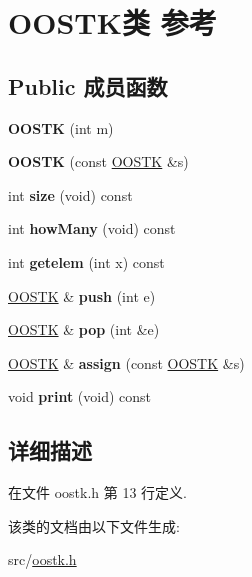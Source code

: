 \hypertarget{classOOSTK}{}\section{O\+O\+S\+T\+K类 参考}
\label{classOOSTK}
\subsection*{Public 成员函数}
\begin{DoxyCompactItemize}
\item 
{\bfseries O\+O\+S\+TK} (int m)\hypertarget{classOOSTK_af1012889d2e4e1ef9acfbe107feb241e}{}\label{classOOSTK_af1012889d2e4e1ef9acfbe107feb241e}

\item 
{\bfseries O\+O\+S\+TK} (const \hyperlink{classOOSTK}{O\+O\+S\+TK} \&s)\hypertarget{classOOSTK_aff2d32aaf48160e5b1ad971445ce8f15}{}\label{classOOSTK_aff2d32aaf48160e5b1ad971445ce8f15}

\item 
int {\bfseries size} (void) const \hypertarget{classOOSTK_a1c669595dd6c02f12f73c6682e7ca068}{}\label{classOOSTK_a1c669595dd6c02f12f73c6682e7ca068}

\item 
int {\bfseries how\+Many} (void) const \hypertarget{classOOSTK_a836995fe52d01742772caf5352d8b442}{}\label{classOOSTK_a836995fe52d01742772caf5352d8b442}

\item 
int {\bfseries getelem} (int x) const \hypertarget{classOOSTK_a6585038cd5bd92fd24e6ef735778195d}{}\label{classOOSTK_a6585038cd5bd92fd24e6ef735778195d}

\item 
\hyperlink{classOOSTK}{O\+O\+S\+TK} \& {\bfseries push} (int e)\hypertarget{classOOSTK_a352fdeb1209f0de9512c827cd0611117}{}\label{classOOSTK_a352fdeb1209f0de9512c827cd0611117}

\item 
\hyperlink{classOOSTK}{O\+O\+S\+TK} \& {\bfseries pop} (int \&e)\hypertarget{classOOSTK_aa0f59937c3dd01d09da5975fe7618f96}{}\label{classOOSTK_aa0f59937c3dd01d09da5975fe7618f96}

\item 
\hyperlink{classOOSTK}{O\+O\+S\+TK} \& {\bfseries assign} (const \hyperlink{classOOSTK}{O\+O\+S\+TK} \&s)\hypertarget{classOOSTK_a396ca951fcee87832141d86213cc661c}{}\label{classOOSTK_a396ca951fcee87832141d86213cc661c}

\item 
void {\bfseries print} (void) const \hypertarget{classOOSTK_a343813b38df610cb507884df82715415}{}\label{classOOSTK_a343813b38df610cb507884df82715415}

\end{DoxyCompactItemize}


\subsection{详细描述}


在文件 oostk.\+h 第 13 行定义.



该类的文档由以下文件生成\+:\begin{DoxyCompactItemize}
\item 
src/\hyperlink{oostk_8h}{oostk.\+h}\end{DoxyCompactItemize}
